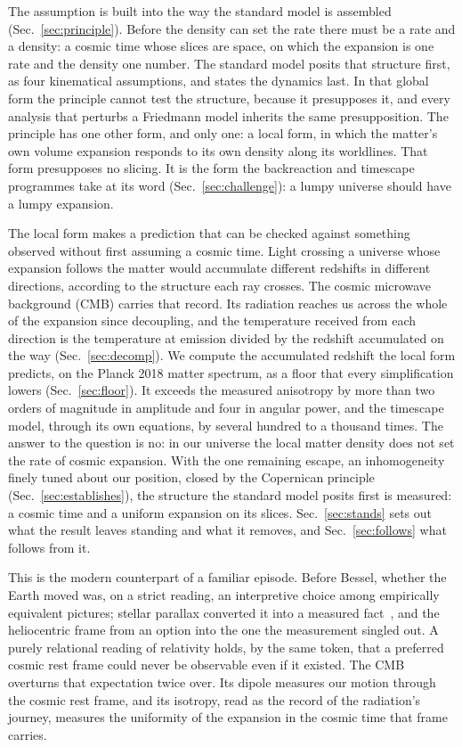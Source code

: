 \documentclass[aps,prd,reprint,amsmath,amssymb,superscriptaddress]{revtex4-2}
\begin{document}
The assumption is built into the way the standard model is assembled (Sec.~\ref{sec:principle}). Before the density can set the rate there must be a rate and a density: a cosmic time whose slices are space, on which the expansion is one rate and the density one number. The standard model posits that structure first, as four kinematical assumptions, and states the dynamics last. In that global form the principle cannot test the structure, because it presupposes it, and every analysis that perturbs a Friedmann model inherits the same presupposition. The principle has one other form, and only one: a local form, in which the matter's own volume expansion responds to its own density along its worldlines. That form presupposes no slicing. It is the form the backreaction and timescape programmes take at its word (Sec.~\ref{sec:challenge}): a lumpy universe should have a lumpy expansion.

The local form makes a prediction that can be checked against something observed without first assuming a cosmic time. Light crossing a universe whose expansion follows the matter would accumulate different redshifts in different directions, according to the structure each ray crosses. The cosmic microwave background (CMB) carries that record. Its radiation reaches us across the whole of the expansion since decoupling, and the temperature received from each direction is the temperature at emission divided by the redshift accumulated on the way (Sec.~\ref{sec:decomp}). We compute the accumulated redshift the local form predicts, on the Planck 2018 matter spectrum, as a floor that every simplification lowers (Sec.~\ref{sec:floor}). It exceeds the measured anisotropy by more than two orders of magnitude in amplitude and four in angular power, and the timescape model, through its own equations, by several hundred to a thousand times. The answer to the question is no: in our universe the local matter density does not set the rate of cosmic expansion. With the one remaining escape, an inhomogeneity finely tuned about our position, closed by the Copernican principle (Sec.~\ref{sec:establishes}), the structure the standard model posits first is measured: a cosmic time and a uniform expansion on its slices. Sec.~\ref{sec:stands} sets out what the result leaves standing and what it removes, and Sec.~\ref{sec:follows} what follows from it.

This is the modern counterpart of a familiar episode. Before Bessel, whether the Earth moved was, on a strict reading, an interpretive choice among empirically equivalent pictures; stellar parallax converted it into a measured fact~\cite{Bessel1838}, and the heliocentric frame from an option into the one the measurement singled out. A purely relational reading of relativity holds, by the same token, that a preferred cosmic rest frame could never be observable even if it existed. The CMB overturns that expectation twice over. Its dipole measures our motion through the cosmic rest frame, and its isotropy, read as the record of the radiation's journey, measures the uniformity of the expansion in the cosmic time that frame carries.
\end{document}
